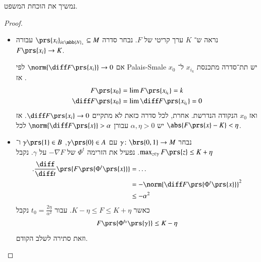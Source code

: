 \documentclass[a4paper,10pt,twoside,openany]{book}
\begin{document}
נמשיך את הוכחת המשפט.

\begin{proof}
\begin{itemize}
\item נראה ש־%
$K$
ערך קריטי של
$F$.
נבחר סדרה
$\prs{x_i}_{i \in \mbb{N}_+} \subseteq M$
עבורה
$F\prs{x_i} \to K$.

אם
$\norm{\diff F\prs{x_i}} \to 0$
לפי
\textenglish{Palais-Smale}
יש תת־סדרה מתכנסת
$x_{i_k}$
ל־%
$x_0$.
אז
\begin{align*}
F\prs{x_0} &= \lim F\prs{x_{i_k}} = k \\
\diff F\prs{x_0} &= \lim \diff F\prs{x_{i_k}} = 0
\end{align*}
ואז
$x_0$
הנקודה הנדרשת.
אחרת,
לכל סדרה כזאת לא מתקיים
$\diff F\prs{x_i} \to 0$.
אז יש
$\alpha,\eta > 0$
עבורן
$\norm{\diff F\prs{x}} > \alpha$
לכל
$\abs{F\prs{x} - K} < \eta$.

\item נבחר
$\gamma \colon \brs{0,1} \to M$
עם
$\gamma\prs{0} \in A$,
$\gamma\prs{1} \in B$
ו־%
$\max_{z \in \gamma} F\prs{z} \leq K + \eta$.
נפעיל את הזרימה
$\Phi^t$
של
$- \nabla F$
על
$\gamma$.
נקבל
\begin{align*}
\text{.} \frac{\diff}{\diff t} \prs{F\prs{\Phi^t\prs{x}}} &= \ldots
\\&= -\norm{\diff F\prs{\Phi^t\prs{x}}}^2
\\&\leq -\alpha^2
\end{align*}
כאשר
$K - \eta \leq F \leq K + \eta$.
עבור
$t_0 = \frac{2 \eta}{\alpha^2}$
נקבל
\[F\prs{\Phi^{t_0}\prs{\gamma}} \leq K - \eta\]
וזאת סתירה לשלב הקודם.
\end{itemize}
\end{proof}









\backmatter
\end{document}
